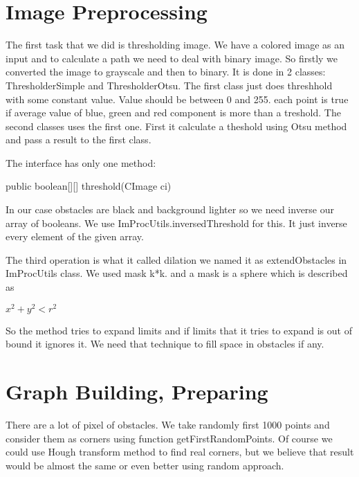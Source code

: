 \documentclass[12pt]{article}
\begin{document}
\maketitle

\begin{abstract}

\end{abstract}

\section{Image Preprocessing}

The first task that we did is thresholding image. We have a colored image as an input and to calculate a path we need to deal with binary image. So firstly we converted the image to grayscale and then to binary. It is done in 2 classes: ThresholderSimple and ThresholderOtsu. The first class just does threshhold with some constant value. Value should be between 0 and 255. each point is true if average value of blue, green and red component is more than a treshold. The second classes uses the first one. First it calculate a theshold using Otsu method and pass a result to the first class.

The interface has only one method:

    public boolean[][] threshold(CImage ci)

In our case obstacles are black and background lighter so we need inverse our array of booleans. We use ImProcUtils.inversedThreshold for this. It just inverse every element of the given array.

The third operation is what it called dilation we named it as extendObstacles in ImProcUtils class. We used mask k*k. and a mask is a sphere which is described as

$x^2 + y^2 < r^2$

So the method tries to expand limits and if limits that it tries to expand is out of bound it ignores it. We need that technique to fill space in obstacles if any.

\section{Graph Building, Preparing}

There are a lot of pixel of obstacles. We take randomly first 1000 points and consider them as corners using function getFirstRandomPoints. Of course we could use Hough transform method to find real corners, but we believe that result would be almost the same or even better using random approach.
\end{document}
